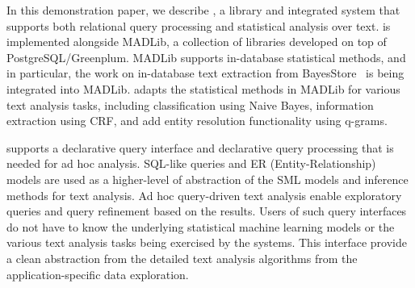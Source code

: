 
In this demonstration paper, we describe \system, a library and integrated
system that supports both relational query processing and
statistical analysis over text. \system is implemented alongside MADLib,
a collection of libraries developed on 
top of PostgreSQL/Greenplum. MADLib supports
in-database statistical methods, and in particular, the work on in-database text extraction
 from BayesStore~\cite{Wang:2008:BML:1453856.1453896} is being integrated into
 MADLib. \system adapts the statistical methods in MADLib for various text analysis tasks, including classification using Naive Bayes, information extraction using CRF,
and add entity resolution functionality using q-grams.


\system supports a declarative query interface and declarative query processing 
that is needed for ad hoc
analysis. SQL-like queries and ER (Entity-Relationship) models are used as a higher-level of
abstraction of the SML models and inference methods for text
analysis. Ad hoc query-driven text analysis enable exploratory
queries and query refinement based on the results. Users of such
query interfaces do not have to know the underlying statistical
machine learning models or the various text analysis tasks being
exercised by the systems. This interface provide a clean abstraction
from the detailed text analysis algorithms from the
application-specific data exploration.


